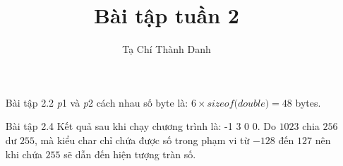 \documentclass[a4paper, 12pt, notitlepage]{article}
\title{Bài tập tuần 2}
\author{Tạ Chí Thành Danh}
\begin{document}
  \maketitle
  \begin{enumerate}[font=\bfseries]
    \item[Bài tập 2.2] \textit{p}1 và \textit{p}2 cách nhau số byte là: \(6 \times \textit{sizeof(double)} = 48\) bytes.
    \item[Bài tập 2.4] Kết quả sau khi chạy chương trình là: -1 3 0 0. Do \(1023\) chia \(256\) dư \(255\), mà kiểu char chỉ chứa được  số trong phạm vi từ \(-128\) đến \(127\) nên khi chứa \(255\) sẽ dẫn đến hiện tượng tràn số.
  \end{enumerate}
  
\end{document}
